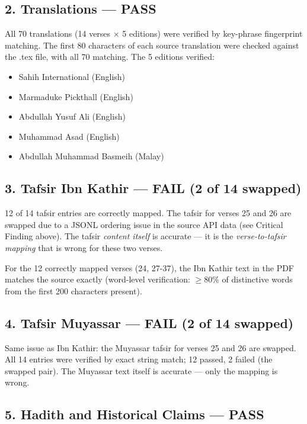 \documentclass[11pt,a4paper]{article}
\begin{document}
\subsection*{2. Translations --- PASS}

All 70 translations (14 verses $\times$ 5 editions) were verified by key-phrase fingerprint matching. The first 80 characters of each source translation were checked against the .tex file, with all 70 matching. The 5 editions verified:
\begin{itemize}
\item Sahih International (English)
\item Marmaduke Pickthall (English)
\item Abdullah Yusuf Ali (English)
\item Muhammad Asad (English)
\item Abdullah Muhammad Basmeih (Malay)
\end{itemize}

\subsection*{3. Tafsir Ibn Kathir --- FAIL (2 of 14 swapped)}

12 of 14 tafsir entries are correctly mapped. The tafsir for verses 25 and 26 are swapped due to a JSONL ordering issue in the source API data (see Critical Finding above). The tafsir \textit{content itself} is accurate --- it is the \textit{verse-to-tafsir mapping} that is wrong for these two verses.

For the 12 correctly mapped verses (24, 27-37), the Ibn Kathir text in the PDF matches the source exactly (word-level verification: $\geq$80\% of distinctive words from the first 200 characters present).

\subsection*{4. Tafsir Muyassar --- FAIL (2 of 14 swapped)}

Same issue as Ibn Kathir: the Muyassar tafsir for verses 25 and 26 are swapped. All 14 entries were verified by exact string match; 12 passed, 2 failed (the swapped pair). The Muyassar text itself is accurate --- only the mapping is wrong.

\subsection*{5. Hadith and Historical Claims --- PASS}
\end{document}

